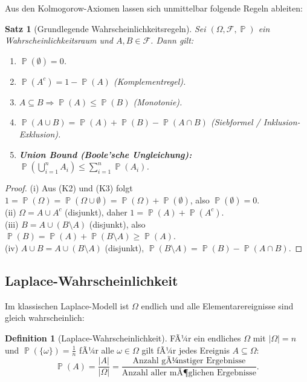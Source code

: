 ﻿\documentclass[12pt,a4paper]{article}
\theoremstyle{definition}
\newtheorem{definition}{Definition}[section]
\theoremstyle{plain}
\newtheorem{satz}{Satz}[section]
\theoremstyle{remark}
\DeclareMathOperator{\Prob}{\mathbb{P}}
\begin{document}
Aus den Kolmogorow-Axiomen lassen sich unmittelbar folgende Regeln ableiten:

\begin{satz}[Grundlegende Wahrscheinlichkeitsregeln]\label{satz:grundregeln}
  Sei $(\Omega, \mathcal{F}, \Prob)$ ein Wahrscheinlichkeitsraum und
  $A, B \in \mathcal{F}$. Dann gilt:
  \begin{enumerate}[label=(\roman*)]
    \item $\Prob(\emptyset) = 0$.
    \item $\Prob(A^c) = 1 - \Prob(A)$ \quad (Komplementregel).
    \item $A \subseteq B \Rightarrow \Prob(A) \leq \Prob(B)$ \quad (Monotonie).
    \item $\Prob(A \cup B) = \Prob(A) + \Prob(B) - \Prob(A \cap B)$ \quad
      (Siebformel / Inklusion-Exklusion).
    \item \textbf{Union Bound (Boole'sche Ungleichung):}
      $\Prob\!\left(\bigcup_{i=1}^{n} A_i\right) \leq \sum_{i=1}^{n} \Prob(A_i)$.
  \end{enumerate}
\end{satz}

\begin{proof}
  (i) Aus (K2) und (K3) folgt
  $1 = \Prob(\Omega) = \Prob(\Omega \cup \emptyset) = \Prob(\Omega) + \Prob(\emptyset)$,
  also $\Prob(\emptyset)=0$.\\
  (ii) $\Omega = A \cup A^c$ (disjunkt), daher $1 = \Prob(A) + \Prob(A^c)$.\\
  (iii) $B = A \cup (B \setminus A)$ (disjunkt), also $\Prob(B) = \Prob(A) + \Prob(B\setminus A) \geq \Prob(A)$.\\
  (iv) $A \cup B = A \cup (B \setminus A)$ (disjunkt), $\Prob(B\setminus A) = \Prob(B) - \Prob(A \cap B)$.
\end{proof}

\subsection{Laplace-Wahrscheinlichkeit}

Im klassischen Laplace-Modell ist $\Omega$ endlich und alle Elementarereignisse
sind gleich wahrscheinlich:

\begin{definition}[Laplace-Wahrscheinlichkeit]\label{def:laplace}
  FÃ¼r ein endliches $\Omega$ mit $|\Omega| = n$ und
  $\Prob(\{\omega\}) = \frac{1}{n}$ fÃ¼r alle $\omega \in \Omega$ gilt fÃ¼r
  jedes Ereignis $A \subseteq \Omega$:
  \[
    \Prob(A) = \frac{|A|}{|\Omega|} = \frac{\text{Anzahl gÃ¼nstiger Ergebnisse}}
    {\text{Anzahl aller mÃ¶glichen Ergebnisse}}.
  \]
\end{definition}
\end{document}
